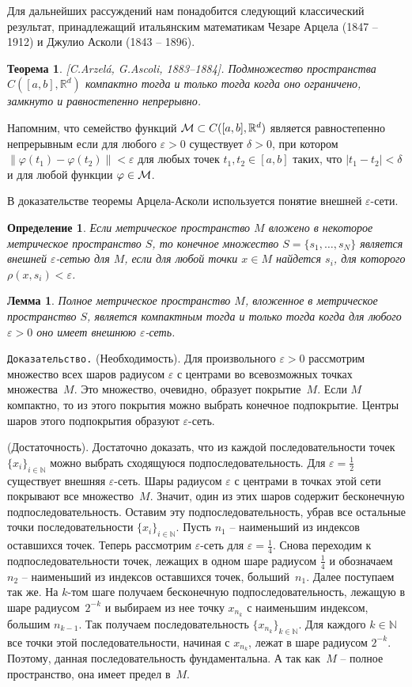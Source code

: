 \documentclass[12pt,a4paper]{article}
\newtheorem{theorem}{Теорема}
\newtheorem{lemma}{Лемма}
\newtheorem{defi}{Определение}
\newcommand{\re}{{\mathbb R}}
\newcommand{\n}{{\mathbb N}}
\newcommand{\cM}{{\cal{M}}}
\begin{document}
Для дальнейших рассуждений нам понадобится следующий классический результат, принадлежащий
итальянским математикам Чезаре Арцела (1847 -- 1912) и Джулио Асколи (1843 -- 1896).
\begin{theorem}\label{th.aa}[C.Arzel\'a, G.Ascoli, 1883--1884].
Подмножество пространства $C([a, b], \re^d)$ компактно тогда и только тогда когда оно ограничено, замкнуто и  равностепенно непрерывно.
\end{theorem}
Напомним, что семейство функций $\cM \subset C([a, b], \re^d)$ является равностепенно непрерывным если для любого $\varepsilon> 0$ существует
$\delta > 0$, при котором $\|\varphi(t_1) - \varphi(t_2)\| < \varepsilon$ для любых точек $t_1, t_2 \in [a, b]$ таких, что $|t_1 - t_2| < \delta$ и для любой функции $\varphi \in \cM$.

В доказательстве теоремы Арцела-Асколи используется понятие внешней $\varepsilon$-сети.
\begin{defi}\label{d.eps}
Если метрическое пространство $M$ вложено в некоторое метрическое пространство $S$,
то конечное множество $S = \{s_1, \ldots , s_N\}$ является внешней $\varepsilon$-сетью для $M$,
если для любой точки  $x \in M$ найдется $s_i$, для которого $\rho(x, s_i) < \varepsilon$.
\end{defi}
\begin{lemma}\label{l.eps}
Полное метрическое пространство $M$, вложенное в  метрическое пространство $S$, является компактным
тогда и только тогда когда для любого $\varepsilon > 0$ оно имеет внешнюю $\varepsilon$-сеть.
\end{lemma}
{\tt Доказательство.} (Необходимость). Для произвольного $\varepsilon > 0$ рассмотрим множество
всех шаров  радиусом
$\varepsilon$ с центрами  во всевозможных  точках множества~$M$. Это множество, очевидно, образует покрытие~$M$.
Если $M$ компактно, то из этого покрытия  можно выбрать конечное подпокрытие. Центры шаров этого подпокрытия образуют $\varepsilon$-сеть.

(Достаточность). Достаточно доказать, что из каждой последовательности точек $\{x_i\}_{i\in \n}$
можно выбрать сходящуюся подпоследовательность. Для $\varepsilon = \frac12$ существует внешняя $\varepsilon$-сеть.
Шары радиусом $\varepsilon$ с центрами в точках этой сети покрывают все множество~$M$. Значит, один из
этих шаров содержит бесконечную подпоследовательность. Оставим эту подпоследовательность, убрав все остальные точки последовательности $\{x_i\}_{i\in \n}$. Пусть $n_1$ -- наименьший из индексов оставшихся точек. Теперь рассмотрим $\varepsilon$-сеть для $\varepsilon = \frac14$. Снова переходим к подпоследовательности точек,
лежащих в одном шаре радиусом $\frac14$ и обозначаем $n_2$ -- наименьший из индексов оставшихся точек,
 больший~$n_1$. Далее поступаем так же. На $k$-том шаге получаем бесконечную подпоследовательность,
 лежащую в шаре радиусом~$2^{-k}$ и выбираем из нее точку $x_{n_k}$ с наименьшим индексом, большим
  $n_{k-1}$. Так получаем последовательность $\{x_{n_k}\}_{k \in \n}$. Для каждого $k \in \n$
  все точки этой последовательности, начиная
  с $x_{n_k}$, лежат в шаре радиусом $2^{-k}$. Поэтому, данная последовательность
  фундаментальна. А так как~$M$ -- полное пространство, она имеет предел в~$M$.
\end{document}
